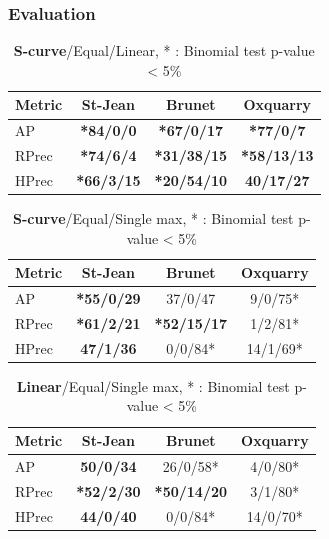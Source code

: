 \subsubsection{Evaluation}

\begin{table}[h]
  \caption{\textbf{S-curve}/Equal/Linear,  * : Binomial test p-value < 5\%}
  \centering
  \label{}
  \begin{tabular}{l c c c}
    \toprule
    Metric & St-Jean & Brunet & Oxquarry \\ \midrule
    AP     & \textbf{*84/0/0} & \textbf{*67/0/17} & \textbf{*77/0/7} \\
    RPrec  & \textbf{*74/6/4} & \textbf{*31/38/15} & \textbf{*58/13/13} \\
    HPrec  & \textbf{*66/3/15} & \textbf{*20/54/10} & \textbf{40/17/27} \\
    \bottomrule
  \end{tabular}
\end{table}

\begin{table}[h]
  \caption{\textbf{S-curve}/Equal/Single max,  * : Binomial test p-value < 5\%}
  \centering
  \label{}
  \begin{tabular}{l c c c}
    \toprule
    Metric & St-Jean  & Brunet & Oxquarry \\ \midrule
    AP     & \textbf{*55/0/29} & 37/0/47 & 9/0/75* \\
    RPrec  & \textbf{*61/2/21} & \textbf{*52/15/17} & 1/2/81* \\
    HPrec  & \textbf{47/1/36} & 0/0/84* & 14/1/69* \\
    \bottomrule
  \end{tabular}
\end{table}

\begin{table}[h]
  \caption{\textbf{Linear}/Equal/Single max,  * : Binomial test p-value < 5\%}
  \centering
  \label{}
  \begin{tabular}{l c c c}
    \toprule
    Metric& St-Jean  & Brunet & Oxquarry \\ \midrule
    AP    & \textbf{50/0/34} & 26/0/58* & 4/0/80* \\
    RPrec & \textbf{*52/2/30} & \textbf{*50/14/20} & 3/1/80* \\
    HPrec & \textbf{44/0/40} & 0/0/84* & 14/0/70* \\
    \bottomrule
  \end{tabular}
\end{table}

